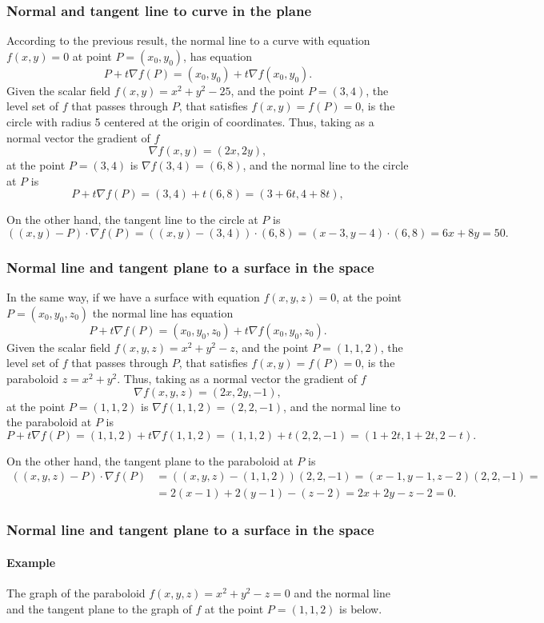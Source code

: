 \begin{frame}
\frametitle{Normal and tangent line to curve in the plane}
According to the previous result, the normal line to a curve with equation $f(x,y)=0$ at point $P=(x_0,y_0)$, has equation
\[
P+t\nabla f(P) = (x_0,y_0)+t\nabla f(x_0,y_0).
\]
Given the scalar field $f(x,y)=x^2+y^2-25$, and the point $P=(3,4)$, the level set of $f$ that passes through $P$, that satisfies $f(x,y)=f(P)=0$, is the circle with radius 5 centered at the origin of coordinates.
Thus, taking as a normal vector the gradient of $f$
\[
\nabla f(x,y) = (2x,2y),
\]
at the point $P=(3,4)$ is $\nabla f(3,4) = (6,8)$, and the normal line to the circle at $P$ is
\[
P+t\nabla f(P) = (3,4)+t(6,8) = (3+6t,4+8t),
\]

On the other hand, the tangent line to the circle at $P$ is
\[
((x,y)-P)\cdot \nabla f(P) = ((x,y)-(3,4))\cdot (6,8) = (x-3,y-4)\cdot(6,8) = 6x+8y=50.
\]
\end{frame}


\begin{frame}
\frametitle{Normal line and tangent plane to a surface in the space}
In the same way, if we have a surface with equation $f(x,y,z)=0$, at the point $P=(x_0,y_0,z_0)$ the normal line has equation
\[
P+t\nabla f(P) = (x_0,y_0,z_0)+t\nabla f(x_0,y_0,z_0).
\]
Given the scalar field $f(x,y,z)=x^2+y^2-z$, and the point $P=(1,1,2)$, the level set of $f$ that passes through $P$, that satisfies $f(x,y)=f(P)=0$, is the paraboloid $z=x^2+y^2$.
Thus, taking as a normal vector the gradient of $f$
\[
\nabla f(x,y,z) = (2x,2y,-1),
\]
at the point $P=(1,1,2)$ is $\nabla f(1,1,2) = (2,2,-1)$, and the normal line to the paraboloid at $P$ is
\[
P+t\nabla f(P) = (1,1,2)+t\nabla f(1,1,2) = (1,1,2)+t(2,2,-1) = (1+2t,1+2t,2-t).
\]

On the other hand, the tangent plane to the paraboloid at $P$ is
\begin{align*}
((x,y,z)-P)\cdot \nabla f(P) &= ((x,y,z)-(1,1,2))(2,2,-1) = (x-1,y-1,z-2)(2,2,-1)=\\
 &= 2(x-1)+2(y-1)-(z-2) = 2x+2y-z-2= 0.
\end{align*}
\end{frame}


\begin{frame}
\frametitle{Normal line and tangent plane to a surface in the space}
\framesubtitle{Example}
The graph of the paraboloid $f(x,y,z)=x^2+y^2-z=0$ and the normal line and the tangent plane to the graph of $f$ at the point $P=(1,1,2)$ is below. 
\begin{center}

\end{center}
\end{frame}



